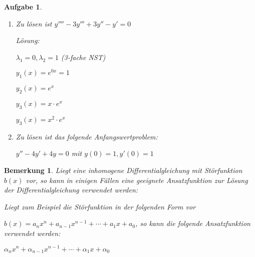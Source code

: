 \documentclass[fontset=ubuntu,12pt,a4paper]{scrreprt}
\newtheorem{bemerkung}[defi]{Bemerkung}
\newtheorem{aufg}[defi]{Aufgabe}
\begin{document}
    \begin{aufg}
        \begin{enumerate}
            \begin{enumerate}[label=\emph{(\roman*)}]
                \item Zu lösen ist \(y''''-3y'''+3y''-y'=0\)
                
                Lösung:
                
                \(\lambda_1=0, \lambda_2=1 \) (3-fache NST)
                
                \(y_1(x)=e^{0x}=1 \)

                \(y_2(x)=e^{x} \)
                
                \(y_3(x)=x\cdot e^{x} \)
                
                \(y_3(x)=x^2\cdot e^{x} \)

                \item Zu lösen ist das folgende Anfangswertproblem:
                
                \(y''-4y'+4y=0\) mit \(y(0)=1,y'(0)=1\)
            \end{enumerate}
        \end{enumerate}
    \end{aufg}

     \begin{bemerkung}
         Liegt eine inhomogene Differentialgleichung mit Störfunktion \(b(x)\) vor, so kann in einigen Fällen eine geeignete Ansatzfunktion zur Lösung der Differentialgleichung verwendet werden:

         Liegt zum Beispiel die Störfunktion in der folgenden Form vor

         \(b(x)=a_n x^n + a_{n-1} x^{n-1} + \cdots + a_1 x + a_0\), so kann die folgende Ansatzfunktion verwendet werden:

         \(\alpha_n x^n + \alpha_{n-1} x^{n-1} + \cdots + \alpha_1 x + \alpha_0\)
     \end{bemerkung}
\end{document}
